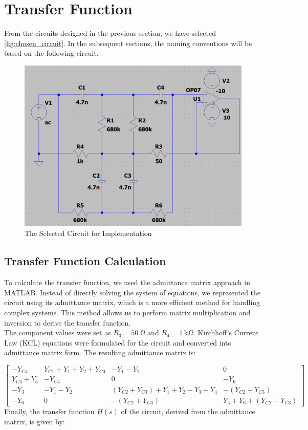 \documentclass[hidelinks,12pt]{article}
\begin{document}
	\pagebreak
	
	\section{Transfer Function}
	From the circuits designed in the previous section, we have selected \cref{fig:chosen_circuit}. In the subsequent sections, the naming conventions will be based on the following circuit.
	
	\begin{figure}[!h]
		\centering
		\includegraphics[scale=0.4]{figures/base_circuit_phase_2.png}
		\caption{The Selected Circuit for Implementation}
	\end{figure}
	
	
	\subsection{Transfer Function Calculation}
	To calculate the transfer function, we used the admittance matrix approach in MATLAB. Instead of directly solving the system of equations, we represented the circuit using its admittance matrix, which is a more efficient method for handling complex systems. This method allows us to perform matrix multiplication and inversion to derive the transfer function. \\
	The component values were set as \( R_{3} = 50\,\Omega \) and \( R_{4} = 1\,\text{k}\Omega \). Kirchhoff's Current Law (KCL) equations were formulated for the circuit and converted into admittance matrix form. The resulting admittance matrix is:
	

	$$
	\begin{bmatrix}
		-Y_{C4} & Y_{C1} + Y_1 + Y_2 + Y_{C4} & -Y_1 - Y_2 & 0 \\
		Y_{C4} + Y_6 & -Y_{C4} & 0 & -Y_6 \\
		-Y_3 & -Y_1 - Y_2 & (Y_{C2} + Y_{C3}) + Y_1 + Y_2 + Y_3 + Y_4 & -(Y_{C2} + Y_{C3}) \\
		-Y_6 & 0 & -(Y_{C2} + Y_{C3}) & Y_5 + Y_6 + (Y_{C2} + Y_{C3})
	\end{bmatrix}
	$$
	\newline
	Finally, the transfer function \( H(s) \) of the circuit, derived from the admittance matrix, is given by:
\end{document}
